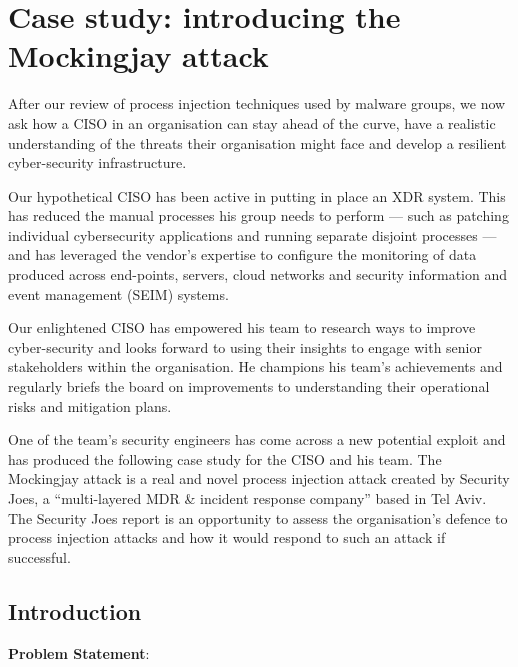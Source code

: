 \pagebreak
\section{Case study: introducing the Mockingjay attack}

After our review of process injection techniques used by malware groups, we now ask how a CISO in an organisation can stay ahead of the curve,
have a realistic understanding of the threats their organisation might face and develop a resilient cyber-security infrastructure.

Our hypothetical CISO has been active in putting in place an XDR system. This has reduced the manual processes his group needs to
perform --- such as patching individual cybersecurity applications and running separate disjoint processes --- and has leveraged the
vendor's expertise to configure the monitoring of data produced across end-points, servers, cloud networks and
security information and event management (SEIM) systems.

Our enlightened CISO has empowered his team to research ways to improve cyber-security and looks forward to using their
insights to engage with senior stakeholders within the organisation.  He champions his team's achievements and regularly
briefs the board on improvements to understanding their operational risks and mitigation plans.

One of the team's security engineers has come across a new potential exploit and has produced the following case study for the CISO
and his team.  The Mockingjay attack \autocite{Peixoto:2023} is a real and novel process injection attack created by Security Joes, a
``multi-layered MDR \& incident response company'' based in Tel Aviv.  The Security Joes report is an opportunity to assess the organisation's
defence to process injection attacks and how it would respond to such an attack if successful.

\subsection{Introduction}

\textbf{Problem Statement}:

